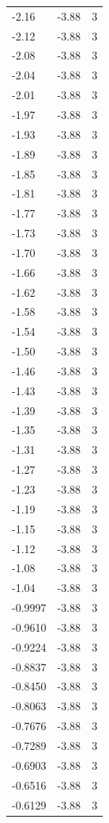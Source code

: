 \begin{longtable}{lrr}
  -2.16 & -3.88 & 3 \\
  -2.12 & -3.88 & 3 \\
  -2.08 & -3.88 & 3 \\
  -2.04 & -3.88 & 3 \\
  -2.01 & -3.88 & 3 \\
  -1.97 & -3.88 & 3 \\
  -1.93 & -3.88 & 3 \\
  -1.89 & -3.88 & 3 \\
  -1.85 & -3.88 & 3 \\
  -1.81 & -3.88 & 3 \\
  -1.77 & -3.88 & 3 \\
  -1.73 & -3.88 & 3 \\
  -1.70 & -3.88 & 3 \\
  -1.66 & -3.88 & 3 \\
  -1.62 & -3.88 & 3 \\
  -1.58 & -3.88 & 3 \\
  -1.54 & -3.88 & 3 \\
  -1.50 & -3.88 & 3 \\
  -1.46 & -3.88 & 3 \\
  -1.43 & -3.88 & 3 \\
  -1.39 & -3.88 & 3 \\
  -1.35 & -3.88 & 3 \\
  -1.31 & -3.88 & 3 \\
  -1.27 & -3.88 & 3 \\
  -1.23 & -3.88 & 3 \\
  -1.19 & -3.88 & 3 \\
  -1.15 & -3.88 & 3 \\
  -1.12 & -3.88 & 3 \\
  -1.08 & -3.88 & 3 \\
  -1.04 & -3.88 & 3 \\
  -0.9997 & -3.88 & 3 \\
  -0.9610 & -3.88 & 3 \\
  -0.9224 & -3.88 & 3 \\
  -0.8837 & -3.88 & 3 \\
  -0.8450 & -3.88 & 3 \\
  -0.8063 & -3.88 & 3 \\
  -0.7676 & -3.88 & 3 \\
  -0.7289 & -3.88 & 3 \\
  -0.6903 & -3.88 & 3 \\
  -0.6516 & -3.88 & 3 \\
  -0.6129 & -3.88 & 3 \\

\end{longtable}
